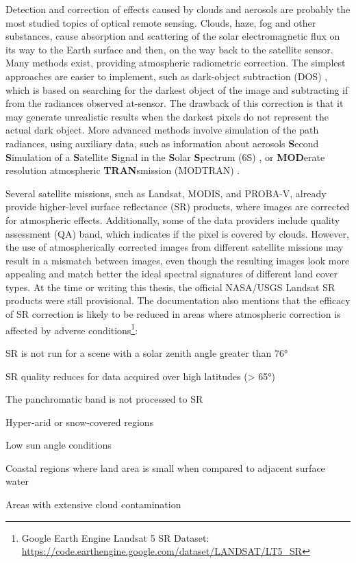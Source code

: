Detection and correction of effects caused by clouds and aerosols are probably the most studied topics of optical remote sensing. Clouds, haze, fog and other substances, cause absorption and scattering of the solar electromagnetic flux on its way to the Earth surface and then, on the way back to the satellite sensor. Many methods exist, providing atmospheric radiometric correction. The simplest approaches are easier to implement, such as dark-object subtraction (DOS) \citep{chavez1996image}, which is based on searching for the darkest object of the image and subtracting if from the radiances observed at-sensor. The drawback of this correction is that it may generate unrealistic results when the darkest pixels do not represent the actual dark object. More advanced methods involve simulation of the path radiances, using auxiliary data, such as information about aerosols \textbf{S}econd \textbf{S}imulation of a \textbf{S}atellite \textbf{S}ignal in the \textbf{S}olar \textbf{S}pectrum (6S) \citep{vermote1997second}, \citep{zhang2012improved} or \textbf{MOD}erate resolution atmospheric \textbf{TRAN}smission (MODTRAN) \citep{berk1987modtran}. 

Several satellite missions, such as Landsat, MODIS, and PROBA-V, already provide higher-level surface reflectance (SR) products, where images are corrected for atmospheric effects. Additionally, some of the data providers include quality assessment (QA) band, which indicates if the pixel is covered by clouds. However, the use of atmospherically corrected images from different satellite missions may result in a mismatch between images, even though the resulting images look more appealing and match better the ideal spectral signatures of different land cover types. At the time or writing this thesis, the official NASA/USGS Landsat SR products were still provisional. The documentation also mentions that the efficacy of SR correction is likely to be reduced in areas where atmospheric correction is affected by adverse conditions\footnote{Google Earth Engine Landsat 5 SR Dataset: \url{https://code.earthengine.google.com/dataset/LANDSAT/LT5\_SR}}:

\begin{enumerate*}[label=(\emph{\alph*})]
	\item SR is not run for a scene with a solar zenith angle greater than 76°
	\item SR quality reduces for data acquired over high latitudes (> 65°)
	\item The panchromatic band is not processed to SR
	\item Hyper-arid or snow-covered regions
	\item Low sun angle conditions
	\item Coastal regions where land area is small when compared to adjacent surface water
	\item Areas with extensive cloud contamination
\end{enumerate*}

